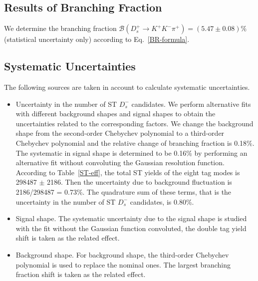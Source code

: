 {    \subsection{Results of Branching Fraction}



    We determine the branching fraction $\mathcal{B}(D_{s}^{+} \rightarrow K^{+}K^{-}\pi^{+})=(5.47\pm0.08)\%$ (statistical uncertainty only) according to Eq.~\ref{BR-formula}.

    \subsection{Systematic Uncertainties}
    The following sources are taken in account to calculate systematic uncertainties.

    \begin{itemize}
        \item Uncertainty in the number of ST $D_{s}^{-}$ candidates. We perform alternative fits with different background shapes and signal shapes to obtain the uncertainties related to the corresponding factors.
            We change the background shape from the second-order Chebychev polynomial to a third-order Chebychev polynomial and the relative change of branching fraction is 0.18\%.
            The systematic in signal shape is determined to be 0.16\% by performing an alternative fit without convoluting the Gaussian resolution function.
            According to Table~\ref{ST-eff}, the total ST yields of the eight tag modes is  298487 $\pm$ 2186. Then the uncertainty due to background fluctuation is 2186/298487 = 0.73\%.
            The quadrature sum of these terms, that is the uncertainty in the number of ST $D_{s}^{-}$ candidates, is 0.80\%. 
        
        \item Signal shape. The systematic uncertainty due to the signal shape is studied with the fit without the Gaussian function convoluted, the double tag yield shift is taken as the related effect. 

        \item Background shape. For background shape, the third-order Chebychev polynomial is used to replace the nominal ones. 
            The largest branching fraction shift is taken as the related effect.
        

\end{itemize}}
